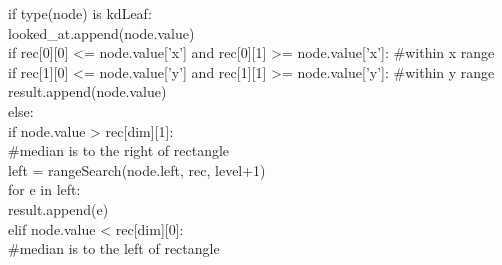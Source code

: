 \documentclass[english, fontsize=12pt, paper=a4, twoside=false, draft=true, pagesize=auto, version=last, DIV=16]{scrartcl}
\theoremstyle{break}
\begin{document}
\hspace*{10mm}if type(node) is kdLeaf:\\
\hspace*{10mm}\hspace*{10mm}looked\_at.append(node.value)\\
\hspace*{10mm}\hspace*{10mm}if rec[0][0] <= node.value['x'] and rec[0][1] >= node.value['x']: \#within x range\\
\hspace*{10mm}\hspace*{10mm\hspace*{10mm}}if rec[1][0] <= node.value['y'] and rec[1][1] >= node.value['y']: \#within y range\\
\hspace*{10mm}\hspace*{10mm}\hspace*{10mm}\hspace*{10mm}result.append(node.value)\\
\hspace*{10mm}else:\\
\hspace*{10mm}\hspace*{10mm}if node.value > rec[dim][1]:\\
\hspace*{10mm}\hspace*{10mm}\hspace*{10mm}\#median is to the right of rectangle\\
\hspace*{10mm}\hspace*{10mm}\hspace*{10mm}left = rangeSearch(node.left, rec, level+1)\\
\hspace*{10mm}\hspace*{10mm}\hspace*{10mm}for e in left:\\
\hspace*{10mm}\hspace*{10mm}\hspace*{10mm}\hspace*{10mm}result.append(e)\\
\hspace*{10mm}\hspace*{10mm}elif node.value < rec[dim][0]:\\
\hspace*{10mm}\hspace*{10mm}\hspace*{10mm}\#median is to the left of rectangle\\
\end{document}
